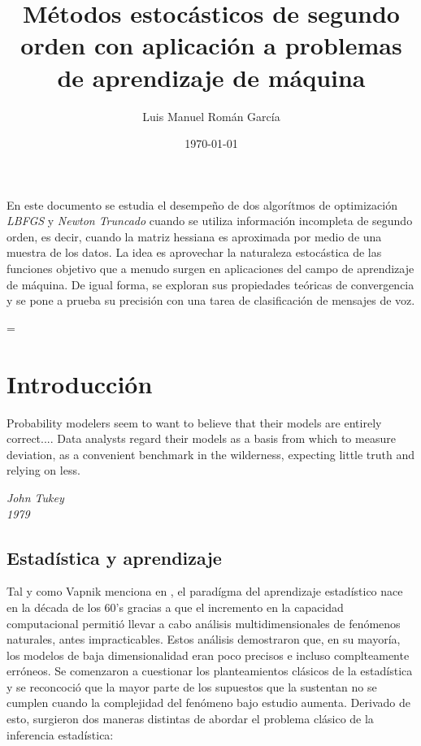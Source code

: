 \documentclass{book}
\title{Métodos estocásticos de segundo orden con aplicación a problemas de aprendizaje de máquina}
\author{Luis Manuel Román García}
\date{\today}
\makeatletter
\theoremstyle{plain}
\theoremstyle{definition}
\theoremstyle{remark}
\newenvironment{abstract}{%
      \titlepage
      \null\vfil
      \@beginparpenalty\@lowpenalty
      \begin{center}%
        \bfseries \abstractname
        \@endparpenalty\@M
      \end{center}}%
     {\par\vfil\null\endtitlepage}
\newenvironment{abstract}{%
      \if@twocolumn
        \section*{\abstractname}%
      \else
        \small
        \begin{center}%
          {\bfseries \abstractname\vspace{-.5em}\vspace{\z@}}%
        \end{center}%
        \quotation
      \fi}
      {\if@twocolumn\else\endquotation\fi}
\newenvironment{absolutelynopagebreak}
  {\par\nobreak\vfil\penalty0\vfilneg
   \vtop\bgroup}
  {\par\xdef\tpd{\the\prevdepth}\egroup
   \prevdepth=\tpd}
\makeatother
\begin{document}
\maketitle
\VerbatimFootnotes


\begin{absolutelynopagebreak}
\begin{abstract}
En este documento se estudia el desempeño de dos algorítmos de optimización \emph{LBFGS} y \emph{Newton Truncado} cuando se utiliza información incompleta de segundo orden, es decir, cuando la matriz hessiana es aproximada por medio de una muestra de los datos. La idea es aprovechar la naturaleza estocástica de las funciones objetivo que a menudo surgen en aplicaciones del campo de aprendizaje de máquina. De igual forma, se exploran sus propiedades teóricas de convergencia y se pone a prueba su precisión con una tarea de clasificación de mensajes de voz.
\end{abstract}
\end{absolutelynopagebreak}

\tableofcontents
{}


\chapter{Introducción}


\epigraph{
 Probability modelers seem to want to believe that their models are entirely correct.... Data analysts regard their models as a basis from which to measure deviation, as a convenient benchmark in the wilderness, expecting little truth and relying on less.}{\textit{John Tukey \\ 1979}}

\newpage

\section{Estadística y aprendizaje}

Tal y como Vapnik menciona en \cite{VAPNIK1}, el paradígma del aprendizaje estadístico nace en la década de los 60's gracias a que el incremento en la capacidad computacional permitió llevar a cabo análisis multidimensionales de fenómenos naturales, antes impracticables. Estos análisis demostraron que, en su mayoría, los modelos de baja dimensionalidad eran poco precisos e incluso complteamente erróneos. Se comenzaron a cuestionar los planteamientos clásicos de la estadística y se reconcoció que la mayor parte de los supuestos que la sustentan no se cumplen cuando la complejidad del fenómeno bajo estudio aumenta. Derivado de esto, surgieron dos maneras distintas de abordar el problema clásico de la inferencia estadística:
\end{document}
